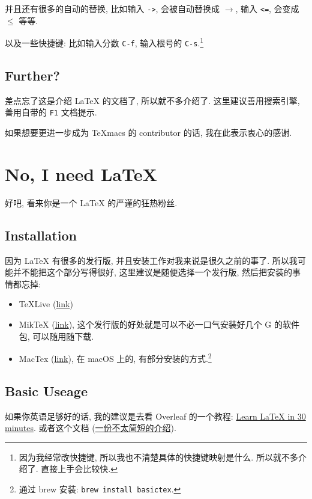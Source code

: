 \documentclass[geomode=digital, code=minted]{boook}
\begin{document}
并且还有很多的自动的替换, 比如输入 \texttt{->},
会被自动替换成 $\rightarrow$, 输入 \texttt{<=}, 会变成 $\leq$ 等等.

以及一些快捷键: 比如输入分数 \texttt{C-f},
输入根号的 \texttt{C-s}.\footnote{
  因为我经常改快捷键, 所以我也不清楚具体的快捷键映射是什么.
  所以就不多介绍了. 直接上手会比较快. 
}

\section{Further?}
差点忘了这是介绍 \LaTeX{} 的文档了, 所以就不多介绍了. 
这里建议善用搜索引擎, 善用自带的 \texttt{F1} 文档提示.

如果想要更进一步成为 TeXmacs 的 contributor 的话,
我在此表示衷心的感谢. 

\chapter{No, I need \LaTeX{}}
好吧, 看来你是一个 \LaTeX{} 的严谨的狂热粉丝. 

\section{Installation}
因为 \LaTeX{} 有很多的发行版, 并且安装工作对我来说是很久之前的事了.
所以我可能并不能把这个部分写得很好, 这里建议是随便选择一个发行版,
然后把安装的事情都忘掉: 

\begin{itemize}
\item TeXLive (\href{https://www.tug.org/texlive/}{link})
\item MikTeX (\href{https://miktex.org}{link}),
  这个发行版的好处就是可以不必一口气安装好几个 G 的软件包,
  可以随用随下载. 
\item MacTex (\href{https://tug.org/mactex/}{link}),
  在 macOS 上的, 有部分安装的方式.\footnote{
    通过 brew 安装: \texttt{brew install basictex}.
  }
    
\end{itemize}

\section{Basic Useage}
如果你英语足够好的话, 我的建议是去看 Overleaf 的一个教程:
\href{https://www.overleaf.com/learn/latex/Learn_LaTeX_in_30_minutes}{Learn \LaTeX{} in 30 minutes}. 或者这个文档 (\href{http://www.ptep-online.com/ctan/lshort_chinese.pdf}{一份不太简短的\LaTeXe{}介绍}).
\end{document}
